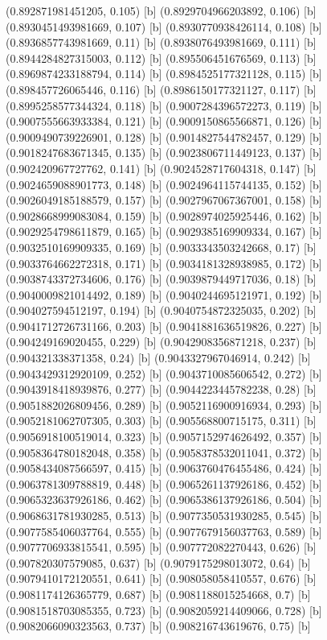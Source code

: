 {{{(0.892871981451205, 0.105) [b] 
(0.8929704966203892, 0.106) [b] 
(0.8930451493981669, 0.107) [b] 
(0.8930770938426114, 0.108) [b] 
(0.8936857743981669, 0.11) [b] 
(0.8938076493981669, 0.111) [b] 
(0.8944284827315003, 0.112) [b] 
(0.895506451676569, 0.113) [b] 
(0.8969874233188794, 0.114) [b] 
(0.8984525177321128, 0.115) [b] 
(0.898457726065446, 0.116) [b] 
(0.8986150177321127, 0.117) [b] 
(0.8995258577344324, 0.118) [b] 
(0.9007284396572273, 0.119) [b] 
(0.9007555663933384, 0.121) [b] 
(0.9009150865566871, 0.126) [b] 
(0.9009490739226901, 0.128) [b] 
(0.9014827544782457, 0.129) [b] 
(0.9018247683671345, 0.135) [b] 
(0.9023806711449123, 0.137) [b] 
(0.902420967727762, 0.141) [b] 
(0.9024528717604318, 0.147) [b] 
(0.9024659088901773, 0.148) [b] 
(0.9024964115744135, 0.152) [b] 
(0.9026049185188579, 0.157) [b] 
(0.9027967067367001, 0.158) [b] 
(0.9028668999083084, 0.159) [b] 
(0.9028974025925446, 0.162) [b] 
(0.9029254798611879, 0.165) [b] 
(0.9029385169909334, 0.167) [b] 
(0.9032510169909335, 0.169) [b] 
(0.9033343503242668, 0.17) [b] 
(0.9033764662272318, 0.171) [b] 
(0.9034181328938985, 0.172) [b] 
(0.9038743372734606, 0.176) [b] 
(0.9039879449717036, 0.18) [b] 
(0.9040009821014492, 0.189) [b] 
(0.9040244695121971, 0.192) [b] 
(0.904027594512197, 0.194) [b] 
(0.9040754872325035, 0.202) [b] 
(0.9041712726731166, 0.203) [b] 
(0.9041881636519826, 0.227) [b] 
(0.904249169020455, 0.229) [b] 
(0.9042908356871218, 0.237) [b] 
(0.904321338371358, 0.24) [b] 
(0.9043327967046914, 0.242) [b] 
(0.9043429312920109, 0.252) [b] 
(0.9043710085606542, 0.272) [b] 
(0.9043918418939876, 0.277) [b] 
(0.9044223445782238, 0.28) [b] 
(0.9051882026809456, 0.289) [b] 
(0.9052116900916934, 0.293) [b] 
(0.9052181062707305, 0.303) [b] 
(0.905568800715175, 0.311) [b] 
(0.9056918100519014, 0.323) [b] 
(0.9057152974626492, 0.357) [b] 
(0.9058364780182048, 0.358) [b] 
(0.9058378532011041, 0.372) [b] 
(0.9058434087566597, 0.415) [b] 
(0.9063760476455486, 0.424) [b] 
(0.9063781309788819, 0.448) [b] 
(0.9065261137926186, 0.452) [b] 
(0.9065323637926186, 0.462) [b] 
(0.9065386137926186, 0.504) [b] 
(0.9068631781930285, 0.513) [b] 
(0.9077350531930285, 0.545) [b] 
(0.9077585406037764, 0.555) [b] 
(0.9077679156037763, 0.589) [b] 
(0.9077706933815541, 0.595) [b] 
(0.907772082270443, 0.626) [b] 
(0.907820307579085, 0.637) [b] 
(0.9079175298013072, 0.64) [b] 
(0.9079410172120551, 0.641) [b] 
(0.908058058410557, 0.676) [b] 
(0.9081174126365779, 0.687) [b] 
(0.9081188015254668, 0.7) [b] 
(0.9081518703085355, 0.723) [b] 
(0.9082059214409066, 0.728) [b] 
(0.9082066090323563, 0.737) [b] 
(0.908216743619676, 0.75) [b] 
}}}
